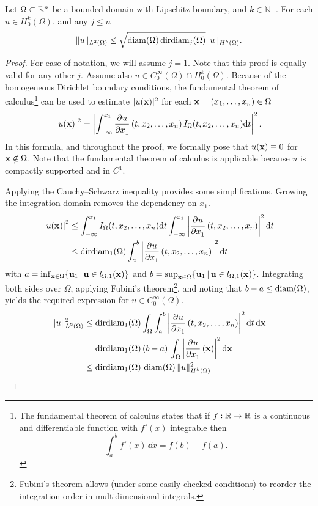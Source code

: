 \begin{lemma}
  \label{lem:friederichs_like}
  Let $\Omega \subset \mathbb{R}^n$ be a bounded domain with Lipschitz boundary, and $k \in \mathbb{N}^{+}$. For each $u \in H_0^k(\Omega)$, and any $j \leq n$
  \begin{equation}
    \label{equ:friederichs_like}
    \| u \|_{L^2(\Omega)} \leq \sqrt{\operatorname{diam}(\Omega) \operatorname{dirdiam}_j(\Omega)} \| u \|_{H^k(\Omega)} \text{.}
  \end{equation}
\end{lemma}
\begin{proof}
  For ease of notation, we will assume $j = 1$. Note that this proof is equally valid for any other $j$. Assume also $u \in C^\infty_0(\Omega) \cap H_0^k(\Omega)$. Because of the homogeneous Dirichlet boundary conditions,
  the fundamental theorem of calculus\footnote{The fundamental theorem of calculus states that if $f : \mathbb{R} \to \mathbb{R}$ is a continuous and differentiable function with $f'(x)$ integrable then
    $$
      \int_a^b f'(x) \, \dd x = f(b) - f(a)\text{.}
    $$} can be used to estimate $|u(\vb{x})|^2$ for each $\vb{x} = (x_1, \dots, x_n) \in \Omega$
  $$
    \left|u(\vb{x})\right|^2 = \left|\int_{-\infty}^{x_1} \pdv[]{u}{x_1}\left(t, x_2, \dots, x_{n}\right)I_\Omega(t,x_2, \dots, x_n)\dd t\right|^2 \text{.}
  $$
  In this formula, and throughout the proof, we formally pose that $u(\vb{x}) \equiv 0$ for $\vb{x} \notin \Omega$. Note that the fundamental theorem of calculus is applicable because $u$ is compactly supported and in $C^1$.

  Applying the Cauchy--Schwarz inequality provides some simplifications. Growing the integration domain removes the dependency on $x_1$.
  \begin{align*}
    \left|u(\vb{x})\right|^2 & \leq \int_{-\infty}^{x_1} I_\Omega(t,x_2, \dots, x_n) \dd t \int_{-\infty}^{x_1} \left|\pdv[]{u}{x_1}\left(t,x_2, \dots, x_n\right)\right|^2\dd t \\
                             & \leq \operatorname{dirdiam}_1(\Omega) \int_{a}^{b} \left|\pdv[]{u}{x_1}\left(t, x_2, \dots, x_n\right)\right|^2\dd t
  \end{align*}
  with $a = \inf_{\vb{x} \in \Omega}\{\vb{u}_1 \,|\, \vb{u} \in l_{\Omega, 1}(\vb{x})\}$ and $b = \sup_{\vb{x} \in \Omega}\{\vb{u}_1 \,|\, \vb{u} \in l_{\Omega, 1}(\vb{x})\}$. Integrating both sides over $\Omega$, applying Fubini's theorem\footnote{Fubini's theorem allows (under some easily checked conditions) to reorder the integration order in multidimensional integrals.}, and noting that $b - a \leq \operatorname{diam}(\Omega)$, yields the required expression for $u \in C^\infty_0(\Omega)$.
  \begin{align*}
    \|u\|_{L^2(\Omega)}^2 & \leq \operatorname{dirdiam}_1(\Omega) \int_\Omega \int_{a}^{b} \left|\pdv[]{u}{x_1}\left(t, x_2, \dots, x_{n}\right)\right|^2\dd t \, \dd \vb{x} \\
                          & = \operatorname{dirdiam}_1(\Omega) \, (b - a) \, \int_{\Omega} \left|\pdv[]{u}{x_1}\left(\vb{x}\right)\right|^2 \dd \vb{x}                       \\
                          & \leq \operatorname{dirdiam}_1(\Omega) \, \operatorname{diam}(\Omega) \, \| u \|^2_{H^k(\Omega)}
  \end{align*}


\end{proof}
